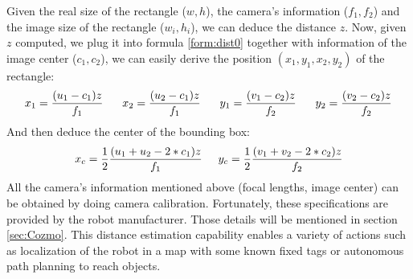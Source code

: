 Given the real size of the rectangle ($w, h$), the camera's information ($f_1, f_2$) and the image size of the rectangle ($w_i, h_i$), we can deduce the distance $z$. Now, given $z$ computed, we plug it into formula \ref{form:dist0} together with information of the image center ($c_1, c_2$), we can easily derive the position $(x_1, y_1, x_2, y_2)$ of the rectangle:
\begin{align}
	x_1 = \frac{(u_1 - c_1)z}{f_1} \hspace{0.6cm}
	x_2 = \frac{(u_2 - c_1)z}{f_1} \hspace{0.6cm}
	y_1 = \frac{(v_1 - c_2)z}{f_2} \hspace{0.6cm}
	y_2 = \frac{(v_2 - c_2)z}{f_2} 
\end{align}
And then deduce the center of the bounding box:
\begin{align}
x_c = \frac{1}{2}\frac{(u_1 + u_2 - 2 * c_1)z}{f_1} \hspace{0.5cm} y_c = \frac{1}{2}\frac{(v_1 + v_2 - 2*c_2)z}{f_2}
\end{align}
All the camera's information mentioned above (focal lengths, image center) can be obtained by doing camera calibration. Fortunately, these specifications are provided by the robot manufacturer. Those details will be mentioned in section \ref{sec:Cozmo}.
This distance estimation capability enables a variety of actions such as localization of the robot in a map with some known fixed tags or autonomous path planning to reach objects.